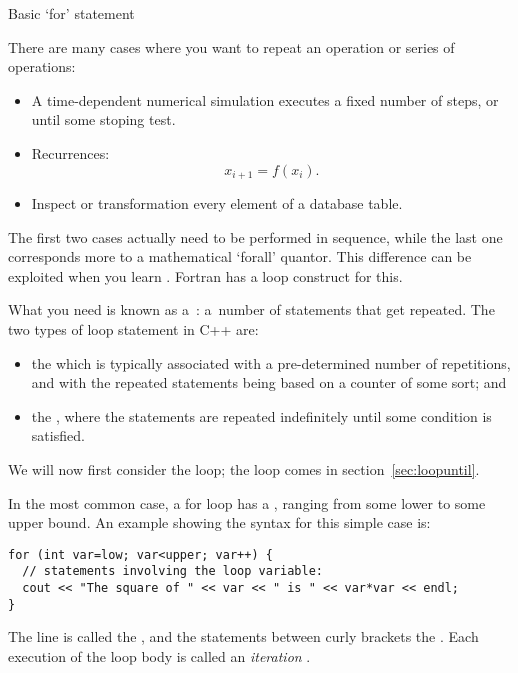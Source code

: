 
 {Basic `for' statement}
\label{sec:for}

There are many cases where you want to repeat an operation or series
of operations:
\begin{itemize}
\item A time-dependent numerical simulation executes a fixed number of
  steps, or until some stoping test.
\item Recurrences: \[ x_{i+1} = f(x_i). \]
\item Inspect or transformation every element of a database table.
\end{itemize}

\begin{remark}
  The first two cases actually need to be performed in
  sequence, while the last one corresponds more to a mathematical
  `forall' quantor. This difference can be exploited when you learn
  . Fortran has a
   loop construct for this.
\end{remark}

What you need is known as a~: a~number of
statements that get repeated. The two types of loop statement in C++ are:
\begin{itemize}
\item the  which is typically associated with
  a pre-determined number of repetitions, and with the repeated
  statements being based on a counter of some sort; and
\item the , where the statements are
  repeated indefinitely until some condition is satisfied.
\end{itemize}
We will now first consider the  loop; the  loop comes in
section~\ref{sec:loopuntil}.

In the most common case, a for loop has a
, ranging from some lower to some upper
bound. An example showing the syntax for this simple case is:
\begin{verbatim}
for (int var=low; var<upper; var++) {
  // statements involving the loop variable:
  cout << "The square of " << var << " is " << var*var << endl;
}
\end{verbatim}
The  line is called the , and the
statements between curly brackets the .
Each execution of the loop body is called an
%
\emph{iteration}%
%
%
.

